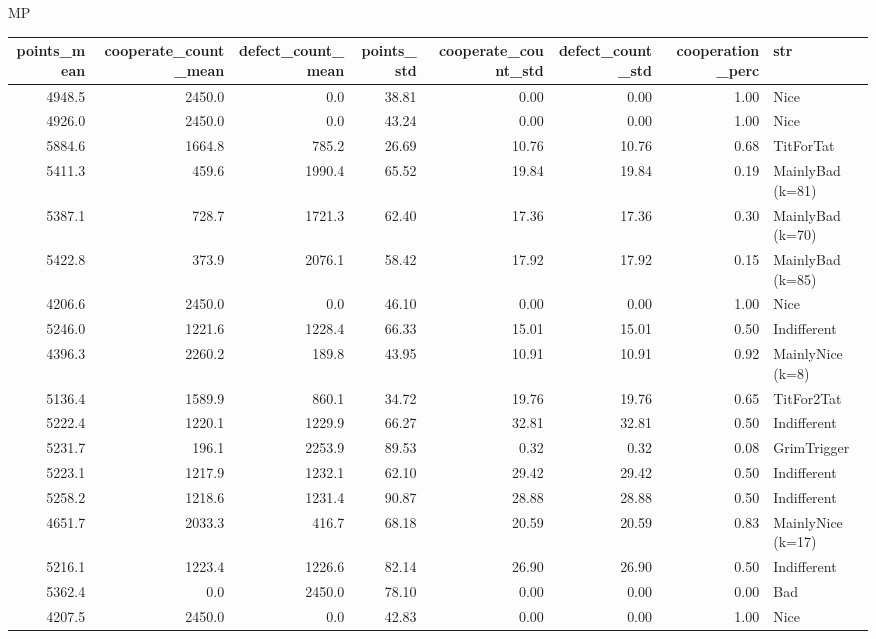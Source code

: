 \documentclass[journal,a4paper,10pt,twoside]{IEEEtran} %
\begin{document}
MP
\begin{tabular}{rrrrrrrl} \toprule
    points\_mean & cooperate\_count\_mean &  defect\_count\_mean &  points\_std &  cooperate\_count\_std &  defect\_count\_std &  cooperation\_perc & str \\ \midrule
    4948.5 &  2450.0 &     0.0 &  38.81 &   0.00 &   0.00 &  1.00 &               Nice \\
    4926.0 &  2450.0 &     0.0 &  43.24 &   0.00 &   0.00 &  1.00 &               Nice \\
    5884.6 &  1664.8 &   785.2 &  26.69 &  10.76 &  10.76 &  0.68 &          TitForTat \\
    5411.3 &   459.6 &  1990.4 &  65.52 &  19.84 &  19.84 &  0.19 &   MainlyBad (k=81) \\
    5387.1 &   728.7 &  1721.3 &  62.40 &  17.36 &  17.36 &  0.30 &   MainlyBad (k=70) \\
    5422.8 &   373.9 &  2076.1 &  58.42 &  17.92 &  17.92 &  0.15 &   MainlyBad (k=85) \\
    4206.6 &  2450.0 &     0.0 &  46.10 &   0.00 &   0.00 &  1.00 &               Nice \\
    5246.0 &  1221.6 &  1228.4 &  66.33 &  15.01 &  15.01 &  0.50 &        Indifferent \\
    4396.3 &  2260.2 &   189.8 &  43.95 &  10.91 &  10.91 &  0.92 &   MainlyNice (k=8) \\
    5136.4 &  1589.9 &   860.1 &  34.72 &  19.76 &  19.76 &  0.65 &         TitFor2Tat \\
    5222.4 &  1220.1 &  1229.9 &  66.27 &  32.81 &  32.81 &  0.50 &        Indifferent \\
    5231.7 &   196.1 &  2253.9 &  89.53 &   0.32 &   0.32 &  0.08 &        GrimTrigger \\
    5223.1 &  1217.9 &  1232.1 &  62.10 &  29.42 &  29.42 &  0.50 &        Indifferent \\
    5258.2 &  1218.6 &  1231.4 &  90.87 &  28.88 &  28.88 &  0.50 &        Indifferent \\
    4651.7 &  2033.3 &   416.7 &  68.18 &  20.59 &  20.59 &  0.83 &  MainlyNice (k=17) \\
    5216.1 &  1223.4 &  1226.6 &  82.14 &  26.90 &  26.90 &  0.50 &        Indifferent \\
    5362.4 &     0.0 &  2450.0 &  78.10 &   0.00 &   0.00 &  0.00 &                Bad \\
    4207.5 &  2450.0 &     0.0 &  42.83 &   0.00 &   0.00 &  1.00 &               Nice \\

\end{tabular}
\end{document}
